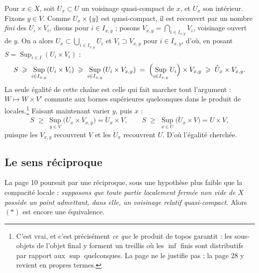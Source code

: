 \documentclass[11pt,a4paper]{article}
\begin{document}
Pour $x \in X$, soit $U_{x} \subset U$ un voisinage quasi-compact de $x$, et
$\mathring{U}_{x}$ son intérieur. Fixons $y \in V$. Comme $U_{x} \times \{y\}$
est quasi-compact, il est recouvert par un nombre \emph{fini} des
$U_{i} \times V_{i}$, disons pour $i \in I_{x,y}$ ; posons
$V_{x,y} = \bigcap_{i \in I_{x,y}} V_{i}$, voisinage ouvert de $y$. On a alors
$U_{x} \subset \bigcup_{i \in I_{x,y}} U_{i}$ et $V_{i} \supset V_{x,y}$ pour
$i \in I_{x,y}$, d'où, en posant
$S = \operatorname*{Sup}_{i \in I}(U_{i} \times V_{i})$ :
\[
S \;\geqslant\; \operatorname*{Sup}_{i \in I_{x,y}}(U_{i} \times V_{i})
\;\geqslant\; \operatorname*{Sup}_{i \in I_{x,y}}(U_{i} \times V_{x,y})
\;=\; \Bigl(\operatorname*{Sup}_{i \in I_{x,y}} U_{i}\Bigr) \times V_{x,y}
\;\geqslant\; \mathring{U}_{x} \times V_{x,y}.
\]
La seule égalité de cette chaîne est celle qui fait marcher tout l'argument :
$W \mapsto W \times V'$ commute aux bornes supérieures quelconques dans le
produit de locales.\footnote{C'est vrai, et c'est précisément \emph{ce que} le
produit de topos garantit : les sous-objets de l'objet final y forment un
treillis où les $\inf$ finis sont distributifs par rapport aux $\sup$
quelconques. La page ne le justifie pas ; la page 28 y revient en propres
termes.} Faisant maintenant varier $y$, puis $x$ :
\[
S \;\geqslant\; \operatorname*{Sup}_{y \in V}
\bigl(\mathring{U}_{x} \times V_{x,y}\bigr)
= \mathring{U}_{x} \times V,
\qquad
S \;\geqslant\; \operatorname*{Sup}_{x \in U}
\bigl(\mathring{U}_{x} \times V\bigr) = U \times V,
\]
puisque les $V_{x,y}$ recouvrent $V$ et les $\mathring{U}_{x}$ recouvrent $U$.
D'où l'égalité cherchée.

\subsection*{Le sens réciproque}

La page 10 poursuit par une réciproque, sous une hypothèse plus faible que la
compacité locale : \emph{supposons que toute partie localement fermée non vide
de $X$ possède un point admettant, dans elle, un voisinage relatif
quasi-compact.} Alors $(*)$ est encore une équivalence.
\end{document}
